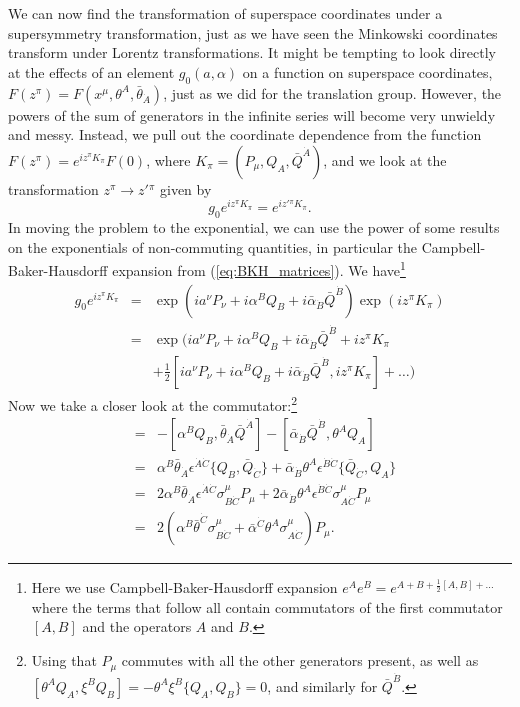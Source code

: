 \documentclass[notes.tex]{subfiles}
\begin{document}
We can now find the transformation of superspace coordinates under a supersymmetry transformation, just as we have seen the Minkowski coordinates transform under Lorentz transformations. It might be tempting to look directly at the effects of an element $g_0(a, \alpha)$ on a function on superspace coordinates, $F(z^\pi) = F(x^\mu, \theta^A, \bar{\theta}_{\dot{A}})$, just as we did for the translation group. However, the powers of the sum of generators in the infinite series will become very unwieldy and messy. Instead, we pull out the coordinate dependence from the function $F(z^\pi) = e^{iz^\pi K_\pi}F(0)$, where $K_\pi=(P_\mu,Q_A,\bar{Q}^{\dot{A}})$,  and we look at the transformation $z^\pi \to z'{}^\pi$ given by
\[g_0e^{iz^\pi K_\pi} = e^{iz'{}^\pi K_\pi}.\]
In moving the problem to the exponential, we can use the power of some results on the exponentials of non-commuting quantities, in particular the Campbell-Baker-Hausdorff expansion from (\ref{eq:BKH_matrices}).
We have\footnote{Here we use Campbell-Baker-Hausdorff expansion $e^{A}e^{B} = e^{A + B + \frac{1}{2}[A, B] + ...}$ where the terms that follow all contain commutators of the first commutator  $[A, B] $ and the operators $A$ and $B$.}
\begin{eqnarray*}
g_0 e^{iz^\pi K_\pi} &=& \exp(ia^\nu P_\nu + i\alpha^BQ_B + i\bar{\alpha}_{\dot{B}}\bar{Q}^{\dot{B}})\exp( iz^\pi K_\pi)\\
&=& \exp(ia^\nu P_\nu + i\alpha^BQ_B + i\bar{\alpha}_{\dot{B}}\bar{Q}^{\dot{B}} + iz^\pi K_\pi\\
&& + \frac{1}{2}[ia^\nu P_\nu + i\alpha^BQ_B + i\bar{\alpha}_{\dot{B}}\bar{Q}^{\dot{B}}, iz^\pi K_\pi] + \ldots)
\end{eqnarray*}
Now we take a closer look at the commutator:\footnote{Using that $P_\mu$ commutes with all the other generators present, as well as $[\theta^A Q_A, \xi^B Q_B] = -\theta^A\xi^B\{Q_A, Q_B\} = 0$, and similarly for $\bar{Q}^{\dot{B}}$.}
\begin{eqnarray*}
[~,~]&=&-[\alpha^BQ_B,\bar{\theta}_{\dot{A}}\bar{Q}^{\dot{A}}] - [\bar{\alpha}_{\dot{B}}\bar{Q}^{\dot{B}}, \theta^AQ_A]\\
&=&\alpha^B\bar{\theta}_{\dot{A}}\epsilon^{\dot{A}\dot{C}}\{Q_B,\bar{Q}_{\dot{C}}\} + \bar{\alpha}_{\dot{B}}\theta^A\epsilon^{\dot{B}\dot{C}}\{\bar{Q}_{\dot{C}}, Q_A\}\\
&=&2\alpha^B\bar{\theta}_{\dot{A}}\epsilon^{\dot{A}\dot{C}}\sigma^\mu_{B\dot{C}}P_\mu + 2\bar{\alpha}_{\dot{B}}\theta^A\epsilon^{\dot{B}\dot{C}}\sigma^\mu_{A\dot{C}}P_\mu\\
&=&2(\alpha^B\bar{\theta}^{\dot{C}}\sigma^\mu_{B\dot{C}} + \bar{\alpha}^{\dot{C}}\theta^A\sigma^\mu_{A\dot{C}})P_\mu .
\end{eqnarray*}
\end{document}
